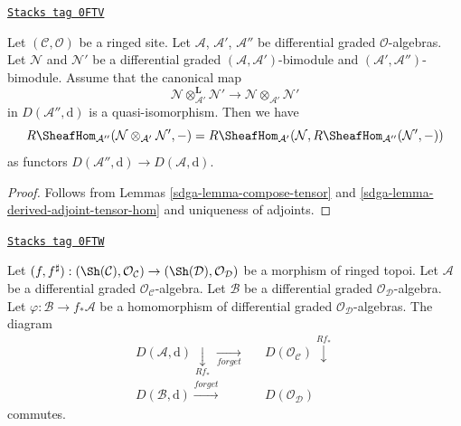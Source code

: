\begin{lemma}
\label{sdga-lemma-compose-hom}
\href{https://stacks.math.columbia.edu/tag/0FTV}{\texttt{Stacks tag 0FTV}}

Let $(\mathcal{C}, \mathcal{O})$ be a ringed site. Let
$\mathcal{A}$, $\mathcal{A}'$, $\mathcal{A}''$ be differential graded
$\mathcal{O}$-algebras. Let $\mathcal{N}$ and $\mathcal{N}'$ be a
differential graded $(\mathcal{A}, \mathcal{A}')$-bimodule
and $(\mathcal{A}', \mathcal{A}'')$-bimodule. Assume
that the canonical map
$$
\mathcal{N} \otimes_{\mathcal{A}'}^\mathbf{L} \mathcal{N}'
\longrightarrow
\mathcal{N} \otimes_{\mathcal{A}'} \mathcal{N}'
$$
in $D(\mathcal{A}'', \text{d})$ is a quasi-isomorphism.
Then we have
$$
R\SheafHom_{\mathcal{A}''}
(\mathcal{N} \otimes_{\mathcal{A}'} \mathcal{N}', -)
=
R\SheafHom_{\mathcal{A}'}(\mathcal{N},
R\SheafHom_{\mathcal{A}''}(\mathcal{N}', -))
$$
as functors $D(\mathcal{A}'', \text{d}) \to D(\mathcal{A}, \text{d})$.
\end{lemma}

\begin{proof}

Follows from Lemmas \ref{sdga-lemma-compose-tensor} and
\ref{sdga-lemma-derived-adjoint-tensor-hom}
and uniqueness of adjoints.
\end{proof}

\begin{lemma}
\label{sdga-lemma-pushforward-agrees}
\href{https://stacks.math.columbia.edu/tag/0FTW}{\texttt{Stacks tag 0FTW}}

Let $(f, f^\sharp) : (\Sh(\mathcal{C}), \mathcal{O}_\mathcal{C})
\to (\Sh(\mathcal{D}), \mathcal{O}_\mathcal{D})$
be a morphism of ringed topoi. Let $\mathcal{A}$ be a differential
graded $\mathcal{O}_\mathcal{C}$-algebra. Let $\mathcal{B}$ be a
differential graded $\mathcal{O}_\mathcal{D}$-algebra. Let
$\varphi : \mathcal{B} \to f_*\mathcal{A}$ be a homomorphism
of differential graded $\mathcal{O}_\mathcal{D}$-algebras.
The diagram
$$
\begin{array}{ccc}D(\mathcal{A}, \text{d}) \underset{Rf_*}{\downarrow}\underset{forget}{\longrightarrow} &  & D(\mathcal{O}_\mathcal{C}) \overset{Rf_*}{\downarrow} \\ D(\mathcal{B}, \text{d}) \overset{forget}{\longrightarrow} &  & D(\mathcal{O}_\mathcal{D})\end{array}
$$
commutes.
\end{lemma}

